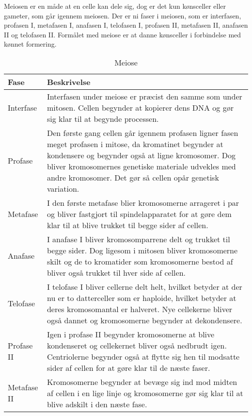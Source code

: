 Meiosen er en måde at en celle kan dele sig, dog er det kun kønsceller eller gameter, som går igennem meiosen. Der er ni faser i meiosen, som er interfasen, profasen I, metafasen I, anafasen I, telofasen I, profasen II, metafasen II, anafasen II og telofasen II. Formålet med meiose er at danne kønsceller i forbindelse med kønnet formering.
\begin{longtable}{ | m{3cm} | m{14cm} |}
    \caption{Meiose} \\
    \hline
    Fase & Beskrivelse \\ \hline
    
    Interfase & Interfasen under meiose er præcist den samme som under mitosen. Cellen begynder at kopierer dens DNA og  gør sig klar til at begynde processen. \\ \hline

    Profase & Den første gang cellen går igennem profasen ligner fasen meget profasen i mitose, da kromatinet begynder at kondensere og begynder også at ligne kromosomer. Dog bliver kromosomernes genetiske materiale udvekles med andre kromosomer. Det gør så cellen opår genetisk variation. \\ \hline

    Metafase &  I den første metafase blier kromosomerne arrageret i par og bliver fastgjort til spindelapparatet for at gøre dem klar til at blive trukket til begge sider af cellen. \\ \hline

    Anafase & I anafase I bliver kromosomparrene delt og trukket til begge sider. Dog ligesom i mitosen bliver kromosomerne skilt og de to kromatider som kromosomerne bestod af bliver også trukket til hver side af cellen. \\ \hline

    Telofase & I telofase I bliver cellerne delt helt, hvilket betyder at der nu er to datterceller som er haploide, hvilket betyder at deres kromosomantal er halveret. Nye cellekerne bliver også dannet og kromosomerne begynder at dekondensere. \\ \hline

   Profase II & Igen i profase II begynder kromosomerne at blive kondenseret og cellekernet bliver også nedbrudt igen. Centriolerne begynder også at flytte sig hen til modsatte sider af cellen for at gøre klar til de næste faser. \\ \hline
 
    Metafase II &  Kromosomerne begynder at bevæge sig ind mod midten af cellen i en lige linje og kromosomerne gør sig klar til at blive adskilt i den næste fase. \\ \hline


\end{longtable}
